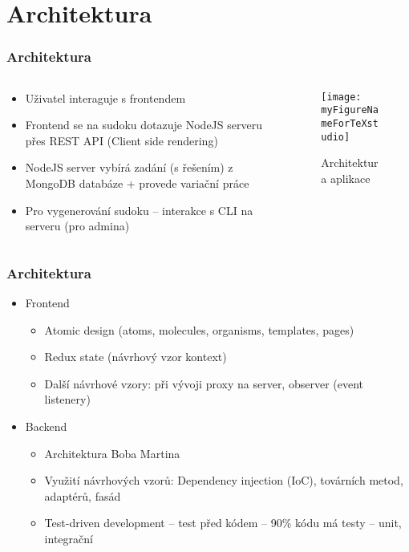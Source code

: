 \documentclass[aspectratio=43]{beamer}
\begin{document}
\section{Architektura}
\begin{frame}[fragile]
	\frametitle{Architektura}
	\begin{columns}
		\begin{column}{0.5\columnwidth}
			\begin{itemize}
				\item Uživatel interaguje s frontendem
				\item Frontend se na sudoku dotazuje NodeJS serveru přes REST API
				      (Client side rendering)
				\item NodeJS server vybírá zadání (s řešením) z MongoDB databáze + 
				provede variační
				      práce
				\item Pro vygenerování sudoku -- interakce s CLI na serveru (pro admina)
			\end{itemize}
		\end{column}
		\begin{column}{0.5\columnwidth}
			\begin{figure}[H]
				\centering {}
				\texttt{[image: \\myFigureNameForTeXstudio]}
				\caption{Architektura aplikace}
				\label{fig:architektura}
			\end{figure}
		\end{column}
	\end{columns}
\end{frame}

\begin{frame}[fragile]
	\frametitle{Architektura}
	\begin{itemize}
		\item Frontend
		\begin{itemize}
			\item Atomic design (atoms, molecules, organisms, templates, pages)
			\item Redux state (návrhový vzor kontext)
			\item Další návrhové vzory: při vývoji proxy na server, observer (event 
			listenery)
		\end{itemize}
		\item Backend
		\begin{itemize}
			\item Architektura Boba Martina
			\item Využití návrhových vzorů: Dependency injection (IoC), továrních 
			metod, adaptérů, fasád
			\item Test-driven development -- test před kódem -- 90\% kódu má testy -- 
			unit, integrační
		\end{itemize}
	\end{itemize}
\end{frame}
\end{document}
